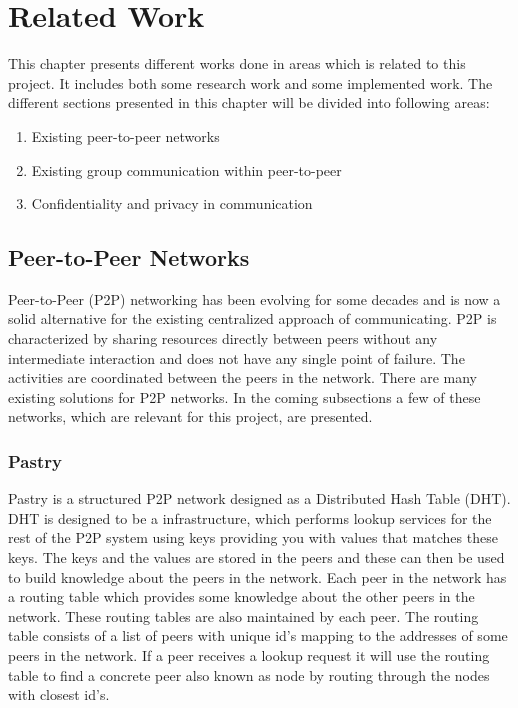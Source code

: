 \chapter{Related Work}
\label{cha:related-work}
This chapter presents different works done in areas which is related to this project. It includes both some research work and some implemented work. 
The different sections presented in this chapter will be divided into following areas:
\begin{enumerate}
	\item Existing peer-to-peer networks
	\item Existing group communication within peer-to-peer  
	\item Confidentiality and privacy in communication
\end{enumerate}

\section{Peer-to-Peer Networks}
\label{sec:p2p-networks}
Peer-to-Peer (P2P) networking has been evolving for some decades and is now a solid alternative for the existing centralized approach of communicating.
P2P is characterized by sharing resources directly between peers without any intermediate interaction and does not have any single point of failure. The activities are coordinated between the peers in the network.
There are many existing solutions for P2P networks. In the coming subsections a few of these networks, which are relevant for this project, are presented. 
\subsection{Pastry}
Pastry is a structured P2P network designed as a Distributed Hash Table (DHT). DHT is designed to be a infrastructure, which performs lookup services for the rest of the P2P system using keys providing you with values that matches these keys.
The keys and the values are stored in the peers and these can then be used to build knowledge about the peers in the network. Each peer in the network has a routing table which provides some knowledge about the other peers in the network. These routing tables are also maintained by each peer.
The routing table consists of a list of peers with unique id's mapping to the addresses of some peers in the network.
If a peer receives a lookup request it will use the routing table to find a concrete peer also known as node by routing through the nodes with closest id's.


